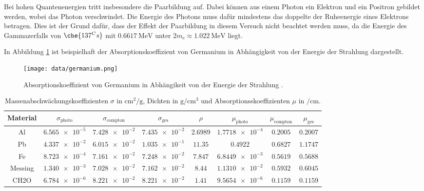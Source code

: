 Bei hohen Quantenenergien tritt insbesondere die Paarbildung auf. Dabei können aus
einem Photon ein Elektron und ein Positron gebildet werden, wobei das
Photon verschwindet. Die Energie des Photons muss dafür mindestens das doppelte
der Ruheenergie eines Elektrons betragen. Dies ist der Grund dafür, dass der Effekt der Paarbildung in diesem Versuch nicht beachtet werden muss, da die Energie des Gammazerfalls von $\che{137^Cs}$ mit $\SI{0.6617}{\mega\electronvolt}$ unter $2m_\text{e} \approx \SI{1.022}{\mega\electronvolt}$ liegt.

In Abbildung \ref{fig:gamma} ist beispielhaft der Absorptionskoeffizient von Germanium in
Abhängigkeit von der Energie der Strahlung dargestellt.

\begin{figure}
  \centering
  \texttt{[image: data/germanium.png]}
  \caption{Absorptionskoeffizient von Germanium in Abhängikeit von der Energie
  der Strahlung \cite{Versuchsanleitung}.}
  \label{fig:gamma}
\end{figure}




\begin{table}[htp]
	\begin{center}
    \caption{Massenabschwächungskoeffizienten $\sigma$ in $\si{\centi\meter\squared\per\gram}$, Dichten in $\si{\gram\per\centi\meter\cubed}$ und Absorptionsskoeffizienten $\mu$ in $\si{\per\centi\meter}$.}
    \label{tab:dicke}
		\begin{tabular}{cccccccc}
		\toprule
			Material & $\sigma_{\text{photo}}$ & $\sigma_{\text{compton}}$ & $\sigma_{\text{ges}}$ & $\rho$ & $\mu_{\text{photo}}$ & $\mu_{\text{compton}}$ & $\mu_{\text{ges}}$\\
			\midrule
			Al & $\num{6.565e-5}$ & $\num{7.428e-2}$ & $\num{7.435e-2}$ & $\num{2.6989}$ & $\num{1.7718e-4}$ & $\num{0.2005}$ & $\num{0.2007}$\\
      Pb & $\num{4.337e-2}$ & $\num{6.015e-2}$ & $\num{1.035e-1}$ & $\num{11.35}$ & $\num{0.4922}$ & $\num{0.6827}$ & $\num{1.1747}$\\
      Fe & $\num{8.723e-4}$ & $\num{7.161e-2}$ & $\num{7.248e-2}$ & $\num{7.847}$ & $\num{6.8449e-3}$ & $\num{0.5619}$ & $\num{0.5688}$\\
      Messing & $\num{1.340e-3}$ & $\num{7.028e-2}$ & $\num{7.162e-2}$ & $\num{8.44}$ & $\num{1.1310e-2}$ & $\num{0.5932}$ & $\num{0.6045}$\\
      CH2O & $\num{6.784e-6}$ & $\num{8.221e-2}$ & $\num{8.221e-2}$ & $\num{1.41}$ & $\num{9.5654e-6}$ & $\num{0.1159}$ & $\num{0.1159}$\\
		\bottomrule
		\end{tabular}
	\end{center}
\end{table}
